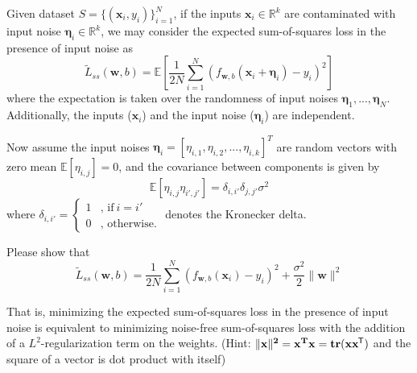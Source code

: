 \documentclass{article}
\newcommand*{\tran}{^{\mkern-1.5mu\mathsf{T}}}
\begin{document}
Given dataset $S = \{(\mathbf{x}_i,y_i)\}_{i=1}^N$, if the inputs $\mathbf{x}_i \in \mathbb{R}^k$ are contaminated with input noise $\boldsymbol{\eta}_i \in \mathbb{R}^k$, we may consider the expected sum-of-squares loss in the presence of input noise as 
$${\tilde L}_{ss}(\mathbf{w},b) = \mathbb{E}\left[ \frac{1}{2N}\sum_{i=1}^{N}\left(f_{\mathbf{w},b}(\mathbf{x}_i + \boldsymbol{\eta}_i)-y_i\right)^2 \right]$$
where the expectation is taken over the randomness of input noises $\boldsymbol{\eta}_1,...,\boldsymbol{\eta}_N$. Additionally, the inputs ($\mathbf{x}_i$) and the input noise ($\boldsymbol{\eta}_i$) are independent.

Now assume the input noises $\mathbf{\eta}_i = [\eta_{i,1}, \eta_{i,2}, ... ,\eta_{i,k}]^T$ are random vectors with zero mean $\mathbb{E}[\eta_{i,j}] = 0$, and the covariance between components is given by
$$\mathbb{E}[\eta_{i,j}\eta_{i',j'}] = \delta_{i,i'}\delta_{j,j'} \sigma^2$$
where $\delta_{i,i'} = \left\{\begin{array}{ll} 
1 & \mbox{, if} ~ i = i'\\
0 & \mbox{, otherwise.}
\end{array}\right.$ denotes the Kronecker delta. 

Please show that
$${\tilde L}_{ss}(\mathbf{w},b) = \frac{1}{2N}\sum_{i=1}^{N}\left(f_{\mathbf{w},b}(\mathbf{x}_i)-y_i\right)^2 + \frac{\sigma^2}{2}\|\mathbf{w}\|^2$$

That is, minimizing the expected sum-of-squares loss in the presence of input noise is equivalent to minimizing noise-free sum-of-squares loss with the addition of a $L^2$-regularization term on the weights.
(Hint: $\|\bf{x}\|^2 = {\bf x}^T{\bf x} = tr({\bf x}{\bf x}\tran)$ and the square of a vector is dot product with itself)
\end{document}
